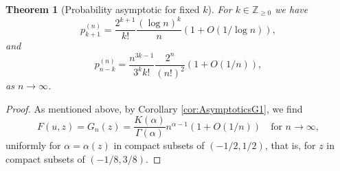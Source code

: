 \documentclass[11pt,a4paper]{article}
\numberwithin{equation}{section}
\newtheorem {theorem}{Theorem}[section]
\def\ZZ{\mathbb{Z}}
\begin{document}
\begin{theorem}[Probability asymptotic for fixed $k$]\label{thm:probab}
    For $k\in\ZZ_{\geq 0}$ we have
    \begin{equation*}
        p_{k+1}^{(n)} = \frac{2^{k+1}}{k!} \frac{(\log n)^{k}}{n} (1+O(1/\log n)),
    \end{equation*}
    and
    \begin{equation}\label{eqn:pnnk}
        p_{n-k}^{(n)} = \frac{n^{3k-1}}{3^k k!} \frac{2^n}{(n!)^2} (1+O(1/n)),
    \end{equation}
    as $n\to\infty$.
\end{theorem}
\begin{proof}
    As mentioned above, by Corollary \ref{cor:AsymptoticsG1}, we find
    \begin{equation*}
        [u^n] F(u,z) = G_n(z) = \frac{K(\alpha)}{\Gamma(\alpha)} n^{\alpha-1} (1+O(1/n))
        \quad \text{for $n\to \infty$},
    \end{equation*}
    uniformly for $\alpha=\alpha(z)$ in compact subsets of $(-1/2,1/2)$, that is, for $z$ in compact subsets of $(-1/8,3/8)$.


\end{proof}
\end{document}
